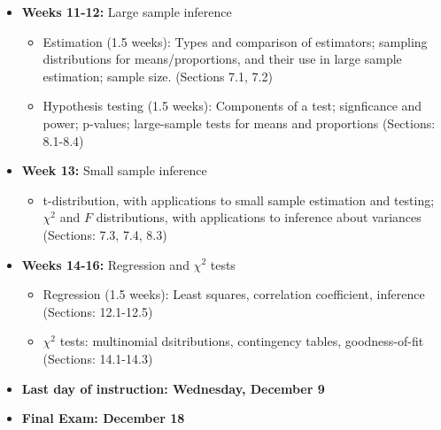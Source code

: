 \documentclass[10pt]{article}
\begin{document}
\begin{itemize}
  \item \textbf{Weeks 11-12:} Large sample inference
  \begin{itemize}
    \item Estimation (1.5 weeks): Types and comparison of estimators; sampling distributions
    for means/proportions, and their use in large sample estimation; sample size. (Sections 7.1,
    7.2)
    \item Hypothesis testing (1.5 weeks): Components of a test; signficance and power; p-values;
    large-sample tests for means and proportions (Sections: 8.1-8.4)
  \end{itemize}
  \item \textbf{Week 13:} Small sample inference
  \begin{itemize}
    \item t-distribution, with applications to small sample estimation and testing; $\chi^{2}$ and $F$
    distributions, with applications to inference about variances (Sections: 7.3, 7.4, 8.3)
  \end{itemize}
  \item \textbf{Weeks 14-16:} Regression and $\chi^{2}$ tests
  \begin{itemize}
    \item Regression (1.5 weeks): Least squares, correlation coefficient, inference (Sections:
    12.1-12.5)
    \item $\chi^{2}$ tests: multinomial dsitributions, contingency tables, goodness-of-fit (Sections: 14.1-14.3)
  \end{itemize}
  \item \textbf{Last day of instruction: Wednesday, December 9}
  \item \textbf{Final Exam: December 18}
\end{itemize} 
\end{document}
